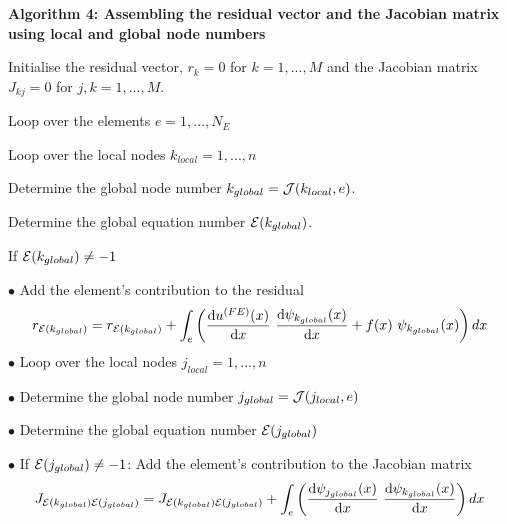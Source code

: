 \begin{center} {\bfseries  Algorithm 4\-: Assembling the residual vector and the Jacobian matrix using local and global node numbers } \end{center} 
\begin{DoxyItemize}
\item Initialise the residual vector, $ r_k=0 $ for $k=1,...,M $ and the Jacobian matrix $ J_{kj}=0 $ for $j,k=1,...,M. $
\item Loop over the elements $e = 1,...,N_E $
\begin{DoxyItemize}
\item Loop over the local nodes $ k_{local}=1,...,n $
\begin{DoxyItemize}
\item Determine the global node number $ k_{global}={\cal J}(k_{local},e) $.
\item Determine the global equation number ${\cal E}(k_{global})$.
\begin{DoxyItemize}
\item If ${\cal E}(k_{global})\ne -1$ \par
\par
 $ \bullet $ Add the element's contribution to the residual \[ r_{{\cal E}(k_{global})} = r_{{\cal E}(k_{global})} + \int_{e} \left( \frac{\mbox{d} u^{(FE)}(x)}{\mbox{d} x} \ \frac{\mbox{d} \psi_{k_{global}}(x)}{\mbox{d} x} + f(x) \ \psi_{k_{global}}(x) \right) dx \] $ \bullet $ Loop over the local nodes $ j_{local}=1,...,n $ \par
\par
 $ \bullet $ Determine the global node number $ j_{global}={\cal J}(j_{local},e) $ \par
\par
 $ \bullet $ Determine the global equation number ${\cal E}(j_{global})$ \par
\par
 $ \bullet $ If ${\cal E}(j_{global})\ne -1$\-: Add the element's contribution to the Jacobian matrix \[ J_{{\cal E}(k_{global}) {\cal E}(j_{global})} = J_{{\cal E}(k_{global}) {\cal E}(j_{global})} + \int_{e} \left( \frac{\mbox{d} \psi_{j_{global}}(x)}{\mbox{d} x} \ \frac{\mbox{d} \psi_{k_{global}}(x)}{\mbox{d} x} \right) dx \]
\end{DoxyItemize}
\end{DoxyItemize}
\end{DoxyItemize}
\end{DoxyItemize}



